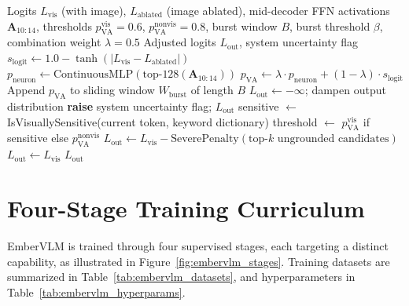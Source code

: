 \begin{algorithm}[htbp]
\small
\caption{Visual Absence (VA) Refiner: per-token hallucination detection and logit intervention.}
\label{alg:va_refiner}
\begin{algorithmic}[1]
\Require Logits $L_{\text{vis}}$ (with image), $L_{\text{ablated}}$ (image ablated),
\Statex \hspace{\algorithmicindent} mid-decoder FFN activations $\mathbf{A}_{10:14}$,
\Statex \hspace{\algorithmicindent} thresholds $p^{\text{vis}}_{\text{VA}}{=}0.6$, $p^{\text{nonvis}}_{\text{VA}}{=}0.8$,
\Statex \hspace{\algorithmicindent} burst window $B$, burst threshold $\beta$, combination weight $\lambda{=}0.5$
\Ensure Adjusted logits $L_{\text{out}}$, system uncertainty flag
\State $s_{\text{logit}} \leftarrow 1.0 - \tanh(|L_{\text{vis}} - L_{\text{ablated}}|)$ \hfill{}
\State $p_{\text{neuron}} \leftarrow \text{ContinuousMLP}(\text{top-}128(\mathbf{A}_{10:14}))$
\State $p_{\text{VA}} \leftarrow \lambda \cdot p_{\text{neuron}} + (1-\lambda) \cdot s_{\text{logit}}$ \hfill{}
\State Append $p_{\text{VA}}$ to sliding window $W_{\text{burst}}$ of length $B$
 
    \State $L_{\text{out}} \leftarrow -\infty$; dampen output distribution
    \State \textbf{raise} system uncertainty flag; \Return $L_{\text{out}}$
\EndIf
\State sensitive $\leftarrow$ IsVisuallySensitive(current token, keyword dictionary)
\State threshold $\leftarrow$ $p^{\text{vis}}_{\text{VA}}$ if sensitive else $p^{\text{nonvis}}_{\text{VA}}$
    \State $L_{\text{out}} \leftarrow L_{\text{vis}} - \text{SeverePenalty}(\text{top-}k\text{ ungrounded candidates})$
\Else
    \State $L_{\text{out}} \leftarrow L_{\text{vis}}$ 
\EndIf
\State \Return $L_{\text{out}}$
\end{algorithmic}
\end{algorithm}

\section{Four-Stage Training Curriculum}
\label{sec:embervlm_training_curriculum}

EmberVLM is trained through four supervised stages, each targeting a distinct capability, as illustrated in Figure~\ref{fig:embervlm_stages}. Training datasets are summarized in Table~\ref{tab:embervlm_datasets}, and hyperparameters in Table~\ref{tab:embervlm_hyperparams}.

